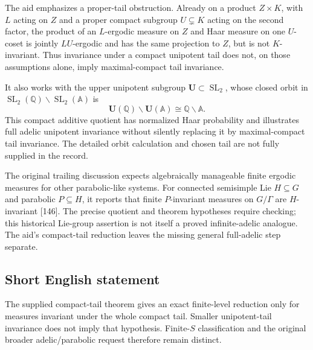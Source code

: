 \documentclass[11pt]{article}
\newcommand{\Q}{\mathbb{Q}}
\begin{document}
The aid emphasizes a proper-tail obstruction. Already on a product \(Z\times K\), with \(L\) acting on \(Z\) and a proper compact subgroup \(U\subsetneq K\) acting on the second factor, the product of an \(L\)-ergodic measure on \(Z\) and Haar measure on one \(U\)-coset is jointly \(LU\)-ergodic and has the same projection to \(Z\), but is not \(K\)-invariant. Thus invariance under a compact unipotent tail does not, on those assumptions alone, imply maximal-compact tail invariance.

It also works with the upper unipotent subgroup \(\mathbf U\subset\operatorname{SL}_2\), whose closed orbit in \(\operatorname{SL}_2(\Q)\backslash\operatorname{SL}_2(\mathbb A)\) is
\[
 \mathbf U(\Q)\backslash\mathbf U(\mathbb A)\cong\Q\backslash\mathbb A.
\]
This compact additive quotient has normalized Haar probability and illustrates full adelic unipotent invariance without silently replacing it by maximal-compact tail invariance. The detailed orbit calculation and chosen tail are not fully supplied in the record.

The original trailing discussion expects algebraically manageable finite ergodic measures for other parabolic-like systems. For connected semisimple Lie \(H\subseteq G\) and parabolic \(P\subseteq H\), it reports that finite \(P\)-invariant measures on \(G/\Gamma\) are \(H\)-invariant [146]. The precise quotient and theorem hypotheses require checking; this historical Lie-group assertion is not itself a proved infinite-adelic analogue. The aid's compact-tail reduction leaves the missing general full-adelic step separate.
\subsection{Short English statement}
The supplied compact-tail theorem gives an exact finite-level reduction only for measures invariant under the whole compact tail. Smaller unipotent-tail invariance does not imply that hypothesis. Finite-\(S\) classification and the original broader adelic/parabolic request therefore remain distinct.
\end{document}
